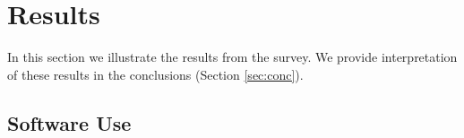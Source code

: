 \section{Results}
\label{sec:res}

In this section we illustrate the results from the survey. We provide interpretation of these results in the conclusions (Section \ref{sec:conc}).

\subsection{Software Use}